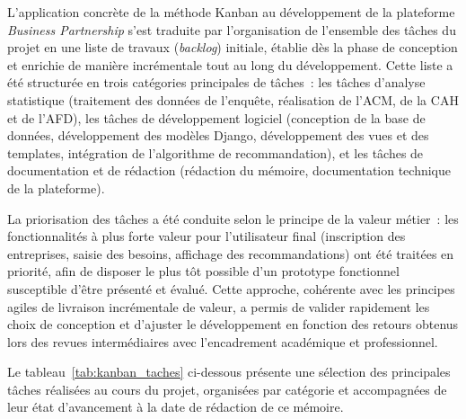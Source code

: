 L'application concrète de la méthode Kanban au développement de la
plateforme \textit{Business Partnership} s'est traduite par
l'organisation de l'ensemble des tâches du projet en une liste de
travaux (\textit{backlog}) initiale, établie dès la phase de
conception et enrichie de manière incrémentale tout au long du
développement. Cette liste a été structurée en trois catégories
principales de tâches~: les tâches d'analyse statistique (traitement
des données de l'enquête, réalisation de l'ACM, de la CAH et de
l'AFD), les tâches de développement logiciel (conception de la base
de données, développement des modèles Django, développement des vues
et des templates, intégration de l'algorithme de recommandation), et
les tâches de documentation et de rédaction (rédaction du mémoire,
documentation technique de la plateforme).

La priorisation des tâches a été conduite selon le principe de la
valeur métier~: les fonctionnalités à plus forte valeur pour
l'utilisateur final (inscription des entreprises, saisie des besoins,
affichage des recommandations) ont été traitées en priorité, afin
de disposer le plus tôt possible d'un prototype fonctionnel
susceptible d'être présenté et évalué. Cette approche, cohérente
avec les principes agiles de livraison incrémentale de valeur,
a permis de valider rapidement les choix de conception et d'ajuster
le développement en fonction des retours obtenus lors des revues
intermédiaires avec l'encadrement académique et professionnel.

Le tableau~\ref{tab:kanban_taches} ci-dessous présente une sélection
des principales tâches réalisées au cours du projet, organisées par
catégorie et accompagnées de leur état d'avancement à la date de
rédaction de ce mémoire.

